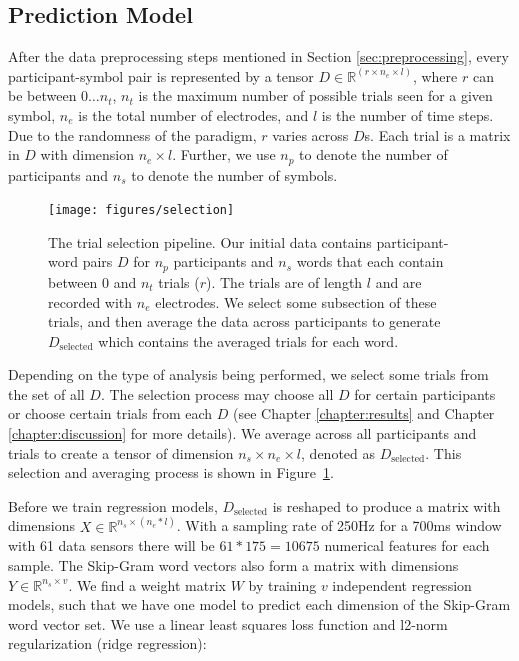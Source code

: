 \subsection{Prediction Model}
After the data preprocessing steps mentioned in Section 
\ref{sec:preprocessing}, every participant-symbol pair is represented by a 
tensor $D \in \mathbb{R}^{(r \times n_e \times l)}$, where $r$ can be between 
$0 \ldots n_t$, $n_t$ is the maximum number of possible trials seen for a given 
symbol, $n_e$ is the total number of electrodes, and $l$ is the number of time 
steps. Due to the randomness of the paradigm, $r$ varies across $D$s. Each 
trial is a matrix in $D$ with dimension $n_e \times l$. Further, we use $n_p$ 
to denote the number of participants and $n_s$ to denote the number of symbols. 

\begin{figure}[!b]
 \centerline{
   \texttt{[image: figures/selection]}
 }
 \caption[Trial Selection Pipeline]{
   The trial selection pipeline. Our initial data contains participant-word 
   pairs $D$ for $n_p$ participants and $n_s$ words that each contain between 0 
   and $n_t$ trials ($r$). The trials are of length $l$ and are recorded with 
   $n_e$ electrodes. We select some subsection of these trials, and then 
   average the data across participants to generate $D_{\text{selected}}$ which 
   contains the averaged trials for each word.
 }
 \label{fig:selection}
\end{figure}

Depending on the type of analysis being performed, we select some trials from 
the set of all $D$. The selection process may choose all $D$ for certain 
participants or choose certain trials from each $D$ (see Chapter 
\ref{chapter:results} and Chapter \ref{chapter:discussion} for more details).  
We average across all participants and trials to create a tensor of dimension 
$n_s \times n_e \times l$, denoted as $D_\text{selected}$. This selection and 
averaging process is shown in Figure~\ref{fig:selection}.

Before we train regression models, $D_{\text{selected}}$ is reshaped to produce 
a matrix with dimensions $X \in \mathbb{R}^{n_s \times (n_e * l)}$.  With a 
sampling rate of 250Hz for a 700ms window with 61 data sensors there will be 
$61*175 = 10675$ numerical features for each sample. The Skip-Gram word vectors 
also form a matrix with dimensions $Y \in \mathbb{R}^{n_s \times v}$. We find a 
weight matrix $W$ by training $v$ independent regression models, such that we 
have one model to predict each dimension of the Skip-Gram word vector set. We 
use a linear least squares loss function and l2-norm regularization (ridge 
regression):

